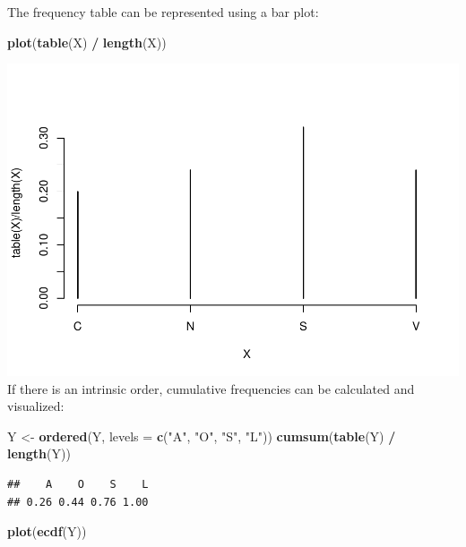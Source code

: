 \documentclass[
]{article}
\newenvironment{Shaded}{\begin{snugshade}}{\end{snugshade}}
\newcommand{\AttributeTok}[1]{\textcolor[rgb]{0.13,0.29,0.53}{#1}}
\newcommand{\FunctionTok}[1]{\textcolor[rgb]{0.13,0.29,0.53}{\textbf{#1}}}
\newcommand{\NormalTok}[1]{#1}
\newcommand{\OtherTok}[1]{\textcolor[rgb]{0.56,0.35,0.01}{#1}}
\newcommand{\SpecialCharTok}[1]{\textcolor[rgb]{0.81,0.36,0.00}{\textbf{#1}}}
\newcommand{\StringTok}[1]{\textcolor[rgb]{0.31,0.60,0.02}{#1}}
\begin{document}
The frequency table can be represented using a bar plot:

\begin{Shaded}
\begin{Highlighting}[]
\FunctionTok{plot}\NormalTok{(}\FunctionTok{table}\NormalTok{(X) }\SpecialCharTok{/} \FunctionTok{length}\NormalTok{(X))}
\end{Highlighting}
\end{Shaded}

\includegraphics{EDA_files/figure-latex/unnamed-chunk-7-1.pdf} If there
is an intrinsic order, cumulative frequencies can be calculated and
visualized:

\begin{Shaded}
\begin{Highlighting}[]
\NormalTok{Y }\OtherTok{\textless{}{-}} \FunctionTok{ordered}\NormalTok{(Y, }\AttributeTok{levels =} \FunctionTok{c}\NormalTok{(}\StringTok{"A"}\NormalTok{, }\StringTok{"O"}\NormalTok{, }\StringTok{"S"}\NormalTok{, }\StringTok{"L"}\NormalTok{))}
\FunctionTok{cumsum}\NormalTok{(}\FunctionTok{table}\NormalTok{(Y) }\SpecialCharTok{/} \FunctionTok{length}\NormalTok{(Y))}
\end{Highlighting}
\end{Shaded}

\begin{verbatim}
##    A    O    S    L 
## 0.26 0.44 0.76 1.00
\end{verbatim}

\begin{Shaded}
\begin{Highlighting}[]
\FunctionTok{plot}\NormalTok{(}\FunctionTok{ecdf}\NormalTok{(Y))}
\end{Highlighting}
\end{Shaded}
\end{document}
